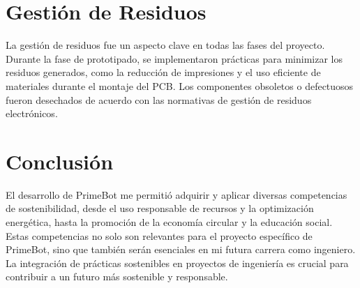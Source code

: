 \section{Gestión de Residuos}
La gestión de residuos fue un aspecto clave en todas las fases del proyecto. Durante la fase de prototipado, se implementaron prácticas para minimizar los residuos generados, como la reducción de impresiones y el uso eficiente de materiales durante el montaje del PCB. Los componentes obsoletos o defectuosos fueron desechados de acuerdo con las normativas de gestión de residuos electrónicos.

\section{Conclusión}
El desarrollo de PrimeBot me permitió adquirir y aplicar diversas competencias de sostenibilidad, desde el uso responsable de recursos y la optimización energética, hasta la promoción de la economía circular y la educación social. Estas competencias no solo son relevantes para el proyecto específico de PrimeBot, sino que también serán esenciales en mi futura carrera como ingeniero. La integración de prácticas sostenibles en proyectos de ingeniería es crucial para contribuir a un futuro más sostenible y responsable.